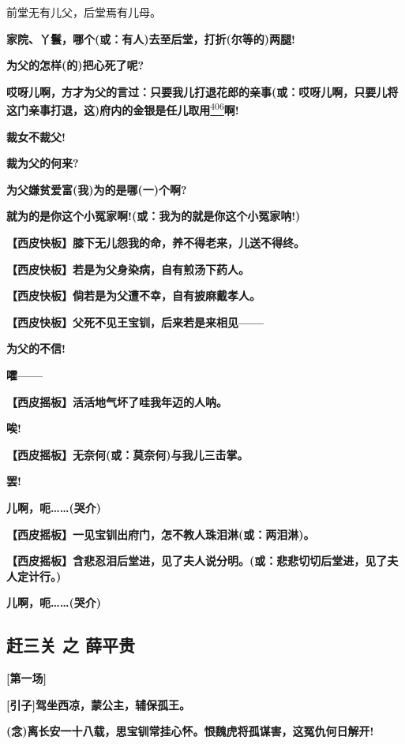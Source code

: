 前堂无有儿父，后堂焉有儿母。

\textbf{家院、丫鬟，哪个(或：有人)去至后堂，打折(尔等的)两腿!}

\textbf{为父的怎样(的)把心死了呢?}

\textbf{哎呀儿啊，方才为父的言过：只要我儿打退花郎的亲事(或：哎呀儿啊，只要儿将这门亲事打退，这)府内的金银是任儿取用}\protect\hyperlink{fn406}{\textsuperscript{406}}\textbf{啊!}

\textbf{裁女不裁父!}

\textbf{裁为父的何来?}

\textbf{为父嫌贫爱富(我)为的是哪(一)个啊?}

\textbf{就为的是你这个小冤家啊!(或：我为的就是你这个小冤家呐!)}

\textbf{【西皮快板】膝下无儿怨我的命，养不得老来，儿送不得终。}

\textbf{【西皮快板】若是为父身染病，自有煎汤下药人。}

\textbf{【西皮快板】倘若是为父遭不幸，自有披麻戴孝人。}

\textbf{【西皮快板】父死不见王宝钏，后来若是来相见------}

\textbf{为父的不信!}

\textbf{嚯------}

\textbf{【西皮摇板】活活地气坏了哇我年迈的人呐。}

\textbf{唉!}

\textbf{【西皮摇板】无奈何(或：莫奈何)与我儿三击掌。}

\textbf{罢!}

\textbf{儿啊，呃\ldots{}\ldots{}(哭介)}

\textbf{【西皮摇板】一见宝钏出府门，怎不教人珠泪淋(或：两泪淋)。}

\textbf{【西皮摇板】含悲忍泪后堂进，见了夫人说分明。(或：悲悲切切后堂进，见了夫人定计行。)}

\textbf{儿啊，呃\ldots{}\ldots{}(哭介)}

\hypertarget{ux8d76ux4e09ux5173-ux4e4b-ux859bux5e73ux8d35}{%
\subsection{赶三关 之
薛平贵}\label{ux8d76ux4e09ux5173-ux4e4b-ux859bux5e73ux8d35}}

\textbf{{[}第一场{]}}

\textbf{{[}引子{]}驾坐西凉，蒙公主，辅保孤王。}

\textbf{(念)离长安一十八载，思宝钏常挂心怀。恨魏虎将孤谋害，这冤仇何日解开!}

